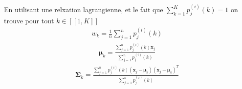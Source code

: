 \documentclass[letterpaper,10pt,french]{sphinxmanual}
\begin{document}
\sphinxAtStartPar
En utilisant une relxation lagrangienne, et le fait que \(\displaystyle\sum_{k=1}^K p_j^{(i)}(k)=1\) on trouve pour tout \(k\in[\![1,K]\!]\)
\begin{equation*}
\begin{split}w_k = \frac1n\displaystyle\sum_{j=1}^n p_j^{(i)}(k)\end{split}
\end{equation*}\begin{equation*}
\begin{split}\boldsymbol\mu_k = \frac{\displaystyle\sum_{j=1}^n p_j^{(i)}(k) \mathbf x_j}{\displaystyle\sum_{j=1}^n p_j^{(i)}(k)}\end{split}
\end{equation*}\begin{equation*}
\begin{split}\boldsymbol\Sigma_{k} = \frac{\displaystyle\sum_{j=1}^n p_j^{(i)}(k) (\mathbf x_j-\boldsymbol\mu_k)(\mathbf x_j-\boldsymbol\mu_k)^T}{\displaystyle\sum_{j=1}^n p_j^{(i)}(k)}\end{split}
\end{equation*}
\end{document}
